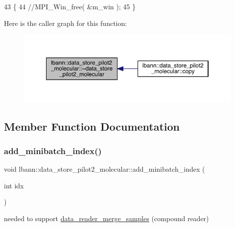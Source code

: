 \begin{DoxyCode}
43                                                           \{
44   \textcolor{comment}{//MPI\_Win\_free( &m\_win );}
45 \}
\end{DoxyCode}
Here is the caller graph for this function\+:\nopagebreak
\begin{figure}[H]
\begin{center}
\leavevmode
\includegraphics[width=350pt]{classlbann_1_1data__store__pilot2__molecular_a73f7d920f8f8174af4c2cec984fee7e6_icgraph}
\end{center}
\end{figure}


\subsection{Member Function Documentation}
\mbox{\label{classlbann_1_1data__store__pilot2__molecular_ae8d35b2245ee84a7e9b3653802e472ca}} 
\subsubsection{\texorpdfstring{add\+\_\+minibatch\+\_\+index()}{add\_minibatch\_index()}}
{\footnotesize\ttfamily void lbann\+::data\+\_\+store\+\_\+pilot2\+\_\+molecular\+::add\+\_\+minibatch\+\_\+index (\begin{DoxyParamCaption}\item[{int}]{idx }\end{DoxyParamCaption})\hspace{0.3cm}{\ttfamily [inline]}}



needed to support \hyperlink{classlbann_1_1data__reader__merge__samples}{data\+\_\+reader\+\_\+merge\+\_\+samples} (compound reader) 



